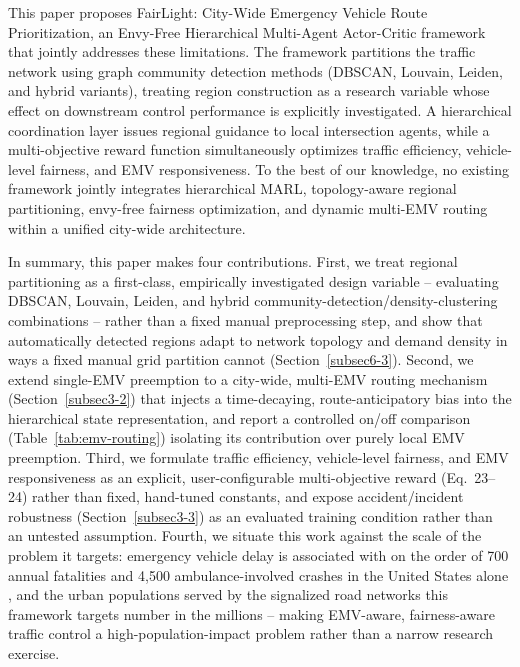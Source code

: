 \documentclass[3p,times]{elsarticle}
\theoremstyle{plain}
\theoremstyle{definition}
\begin{document}
This paper proposes FairLight: City-Wide Emergency Vehicle
Route Prioritization, an Envy-Free Hierarchical Multi-Agent
Actor-Critic framework that jointly addresses these limitations.
The framework partitions the traffic network using graph community
detection methods (DBSCAN, Louvain, Leiden, and hybrid variants),
treating region construction as a research variable whose effect on
downstream control performance is explicitly investigated. A
hierarchical coordination layer issues regional guidance to local
intersection agents, while a multi-objective reward function
simultaneously optimizes traffic efficiency, vehicle-level fairness,
and EMV responsiveness. To the best of our
knowledge, no existing framework jointly integrates hierarchical MARL,
topology-aware regional partitioning, envy-free fairness optimization,
and dynamic multi-EMV routing within a unified city-wide architecture.

In summary, this paper makes four contributions. First, we treat
regional partitioning as a first-class, empirically investigated
design variable -- evaluating DBSCAN, Louvain, Leiden, and hybrid
community-detection/density-clustering combinations -- rather than a
fixed manual preprocessing step, and show that automatically detected
regions adapt to network topology and demand density in ways a fixed
manual grid partition cannot (Section~\ref{subsec6-3}). Second, we
extend single-EMV preemption to a city-wide, multi-EMV routing
mechanism (Section~\ref{subsec3-2}) that injects a time-decaying,
route-anticipatory bias into the hierarchical state representation,
and report a controlled on/off comparison
(Table~\ref{tab:emv-routing}) isolating its contribution over purely
local EMV preemption. Third, we formulate traffic efficiency,
vehicle-level fairness, and EMV responsiveness as an explicit,
user-configurable multi-objective reward (Eq.~23--24) rather than
fixed, hand-tuned constants, and expose accident/incident robustness
(Section~\ref{subsec3-3}) as an evaluated training condition rather
than an untested assumption. Fourth, we situate this work against the
scale of the problem it targets: emergency vehicle delay is associated
with on the order of 700 annual fatalities and 4{,}500
ambulance-involved crashes in the United States alone
\cite{nellore2016}, and the urban populations served by the
signalized road networks this framework targets number in the
millions -- making EMV-aware, fairness-aware traffic control a
high-population-impact problem rather than a narrow research exercise.


\end{document}
